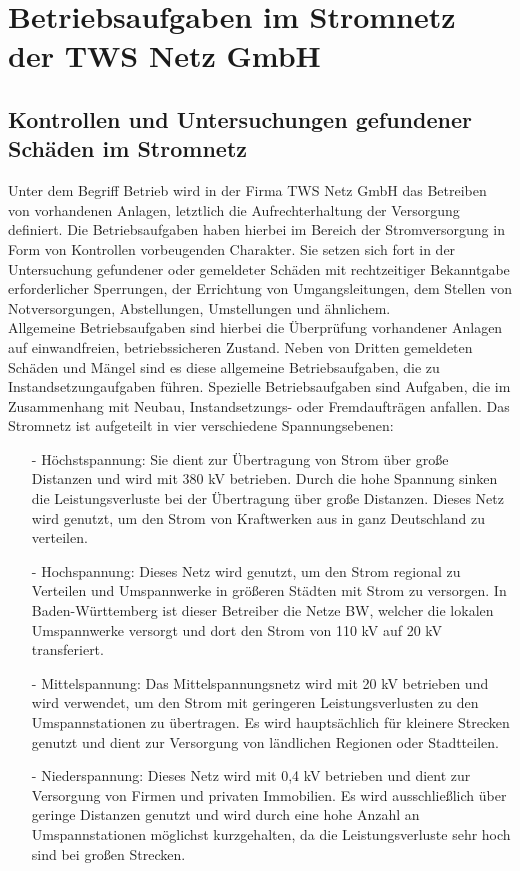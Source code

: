 \chapter{Betriebsaufgaben im Stromnetz der TWS Netz GmbH}
\label{cha:Betriebsaufgaben}

\section{Kontrollen und Untersuchungen gefundener Schäden im Stromnetz}

Unter dem Begriff Betrieb wird in der Firma TWS Netz GmbH das Betreiben von vorhandenen Anlagen, letztlich die Aufrechterhaltung der Versorgung definiert. 
Die Betriebsaufgaben haben hierbei im Bereich der Stromversorgung in Form von Kontrollen vorbeugenden Charakter. Sie setzen sich fort in der Untersuchung gefundener 
oder gemeldeter Schäden mit rechtzeitiger Bekanntgabe erforderlicher Sperrungen, der Errichtung von Umgangsleitungen, dem Stellen von Notversorgungen, 
Abstellungen, Umstellungen und ähnlichem.
\\
Allgemeine Betriebsaufgaben sind hierbei die Überprüfung vorhandener Anlagen auf einwandfreien, betriebssicheren Zustand. Neben von Dritten gemeldeten Schäden
und Mängel sind es diese allgemeine Betriebsaufgaben, die zu Instandsetzungaufgaben führen. Spezielle Betriebsaufgaben sind Aufgaben, die im Zusammenhang 
mit Neubau, Instandsetzungs- oder Fremdaufträgen anfallen. Das Stromnetz ist aufgeteilt in vier verschiedene Spannungsebenen: 
\begin{itemize}
    \item[-] Höchstspannung: Sie dient zur Übertragung von Strom über große Distanzen und wird mit 380 kV betrieben. Durch die hohe Spannung sinken die 
    Leistungsverluste bei der Übertragung über große Distanzen. Dieses Netz wird genutzt, um den Strom von Kraftwerken aus in ganz Deutschland zu verteilen.
    \item[-] Hochspannung: Dieses Netz wird genutzt, um den Strom regional zu Verteilen und Umspannwerke in größeren Städten mit Strom zu versorgen. 
    In Baden-Württemberg ist dieser Betreiber die Netze BW, welcher die lokalen Umspannwerke versorgt und dort den Strom von 110 kV auf 20 kV transferiert.
    \clearpage
    \item[-] Mittelspannung: Das Mittelspannungsnetz wird mit 20 kV betrieben und wird verwendet, um den Strom mit geringeren Leistungsverlusten zu den 
    Umspannstationen zu übertragen. Es wird hauptsächlich für kleinere Strecken genutzt und dient zur Versorgung von ländlichen Regionen oder Stadtteilen.
    \item[-] Niederspannung: Dieses Netz wird mit 0,4 kV betrieben und dient zur Versorgung von Firmen und privaten Immobilien. Es wird ausschließlich über 
    geringe Distanzen genutzt und wird durch eine hohe Anzahl an Umspannstationen möglichst kurzgehalten, da die Leistungsverluste sehr hoch sind bei großen
    Strecken.
\end{itemize}
